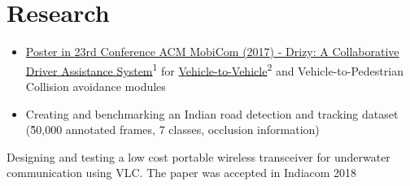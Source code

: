 \documentclass[]{deedy-resume-openfont}
\begin{document}
\begin{minipage}[t]{0.60\textwidth}
\section{Research}
\begin{itemize}
\vspace{-0.07in}
    \item \href{https://dl.acm.org/citation.cfm?doid=3117811.3131255}{Poster in \href{https://www.sigmobile.org/mobicom/2017/}{23rd Conference ACM MobiCom (2017)} - Drizy: A Collaborative Driver Assistance System}\textsuperscript{1}  for
    \href{https://github.com/chetanchawla/Drizy}{Vehicle-to-Vehicle}\textsuperscript{2} and Vehicle-to-Pedestrian Collision avoidance modules
    \vspace{-0.07in}
    \item Creating and benchmarking an Indian road detection and tracking dataset (\~50,000 annotated frames, 7 classes, occlusion information)
\end{itemize}

Designing and testing a low cost portable wireless transceiver for underwater communication using VLC. The paper was accepted in Indiacom 2018
\sectionsep
\hline



\end{minipage}
\end{document}
